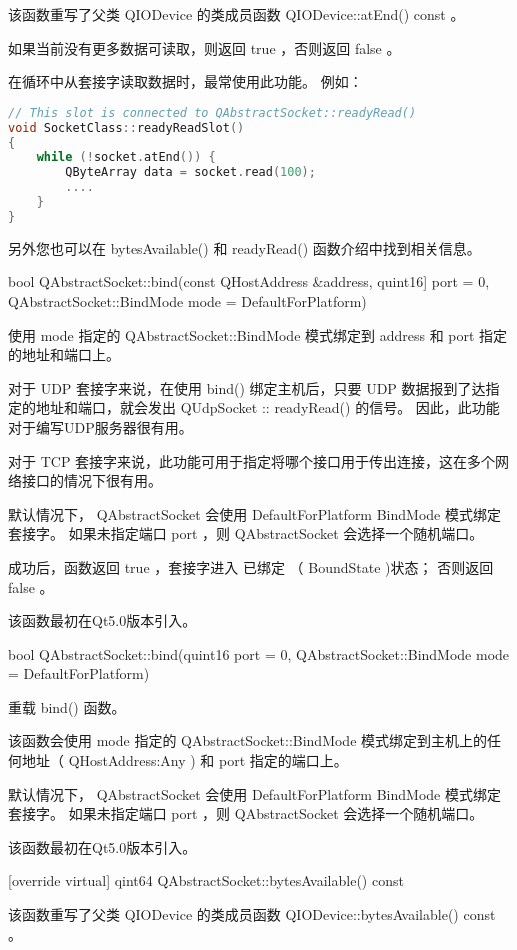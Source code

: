 该函数重写了父类 QIODevice 的类成员函数 QIODevice::atEnd() const 。

如果当前没有更多数据可读取，则返回 true ，否则返回 false 。

在循环中从套接字读取数据时，最常使用此功能。 例如：

\begin{lstlisting}[language=C++]
// This slot is connected to QAbstractSocket::readyRead()
void SocketClass::readyReadSlot()
{
	while (!socket.atEnd()) {
		QByteArray data = socket.read(100);
		....
	}
}
\end{lstlisting}

另外您也可以在 bytesAvailable() 和 readyRead() 函数介绍中找到相关信息。

\splitLine

bool QAbstractSocket::bind(const QHostAddress \&address, quint16] port
= 0, QAbstractSocket::BindMode mode = DefaultForPlatform)

使用 mode 指定的 QAbstractSocket::BindMode 模式绑定到 address 和 port 指定的地址和端口上。

对于 UDP 套接字来说，在使用 bind() 绑定主机后，只要 UDP 数据报到了达指定的地址和端口，就会发出 QUdpSocket :: readyRead() 的信号。 因此，此功能对于编写UDP服务器很有用。

对于 TCP 套接字来说，此功能可用于指定将哪个接口用于传出连接，这在多个网络接口的情况下很有用。

默认情况下， QAbstractSocket 会使用 DefaultForPlatform BindMode 模式绑定套接字。 如果未指定端口 port ，则 QAbstractSocket 会选择一个随机端口。

成功后，函数返回 true ，套接字进入 已绑定 （ BoundState )状态； 否则返回 false 。

该函数最初在Qt5.0版本引入。

bool QAbstractSocket::bind(quint16 port = 0, QAbstractSocket::BindMode
mode = DefaultForPlatform)

重载 bind() 函数。

该函数会使用 mode 指定的 QAbstractSocket::BindMode 模式绑定到主机上的任何地址（ QHostAddress:Any ) 和 port 指定的端口上。

默认情况下， QAbstractSocket 会使用 DefaultForPlatform BindMode 模式绑定套接字。 如果未指定端口 port ，则 QAbstractSocket 会选择一个随机端口。

该函数最初在Qt5.0版本引入。

[override virtual] qint64 QAbstractSocket::bytesAvailable() const

该函数重写了父类 QIODevice 的类成员函数 QIODevice::bytesAvailable() const 。

